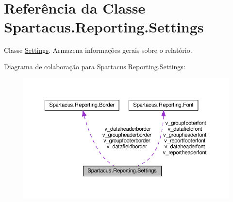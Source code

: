 \hypertarget{classSpartacus_1_1Reporting_1_1Settings}{\section{Referência da Classe Spartacus.\+Reporting.\+Settings}
\label{classSpartacus_1_1Reporting_1_1Settings}
}


Classe \hyperlink{classSpartacus_1_1Reporting_1_1Settings}{Settings}. Armazena informações gerais sobre o relatório.  




Diagrama de colaboração para Spartacus.\+Reporting.\+Settings\+:
\nopagebreak
\begin{figure}[H]
\begin{center}
\leavevmode
\includegraphics[width=350pt]{classSpartacus_1_1Reporting_1_1Settings__coll__graph}
\end{center}
\end{figure}
